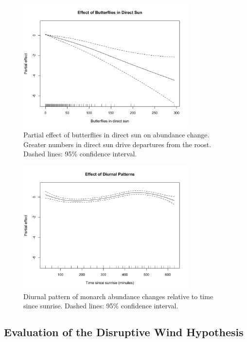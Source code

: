 \begin{figure}[htbp]
\centering
\includegraphics[width=0.8\textwidth]{supplemental/results/thesis_exports/figures/effect_butterflies_direct_sun.png}
\caption{Partial effect of butterflies in direct sun on abundance change. Greater numbers in direct sun drive departures from the roost. Dashed lines: 95\% confidence interval.}\label{fig:effect_sun}
\end{figure}

\begin{figure}[htbp]
\centering
\includegraphics[width=0.8\textwidth]{supplemental/results/thesis_exports/figures/diurnal_patterns.png}
\caption{Diurnal pattern of monarch abundance changes relative to time since sunrise. Dashed lines: 95\% confidence interval.}\label{fig:effect_diurnal}
\end{figure}

\subsection{Evaluation of the Disruptive Wind Hypothesis}

